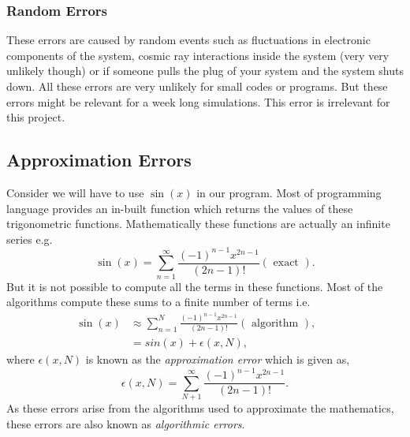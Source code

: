 \documentclass[a4,12pt]{article}
\numberwithin{equation}{subsection}
\begin{document}
\subsubsection{Random Errors}
These errors are caused by random events such as fluctuations in electronic components of the system, cosmic ray interactions inside the system (very very unlikely though) or if someone pulls the plug of your system and the system shuts down. All these errors are very unlikely for small codes or programs. But these errors might be relevant for a week long simulations. This error is irrelevant for this project.

\subsection{Approximation Errors}
Consider we will have to use $\sin(x)$ in our program. Most of programming language provides an in-built function which returns the values of these trigonometric functions. Mathematically these functions are actually an infinite series e.g. 
$$\sin(x) = \sum^{\infty}_{n=1} \frac{(-1)^{n-1}x^{2n-1}}{(2n-1)!} (\text{ exact }).$$
But it is not possible to compute all the terms in these functions. Most of the algorithms compute these sums to a finite number of terms i.e.
\begin{align}
\sin(x) &\approx \sum^{N}_{n=1} \frac{(-1)^{n-1}x^{2n-1}}{(2n-1)!} (\text{ algorithm }), && \\
        &= sin(x)+\epsilon(x,N), && 
 \end{align}  
 where $\epsilon(x,N)$ is known as the \textit{approximation error} which is given as,
$$\epsilon(x,N) = \sum^{\infty}_{N+1} \frac{(-1)^{n-1}x^{2n-1}}{(2n-1)!} .$$
As these errors arise from the algorithms used to approximate the mathematics, these errors are also known as \textit{algorithmic errors}.
\end{document}
